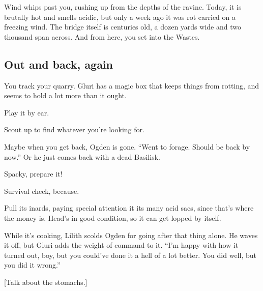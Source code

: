 \begin{multicols}{2}
  Wind whips past you, rushing up from the depths of the ravine.
  Today, it is brutally hot and smells acidic, but only a week ago it was rot carried on
    a freezing wind.
  The bridge itself is centuries old, a dozen yards wide and two thousand span across.
  And from here, you set into the Wastes.

  \subsection{Out and back, again}

  You track your quarry.
  Gluri has a magic box that keeps things from rotting, and seems to hold a lot more than it ought.

  Play it by ear.

  Scout up to find whatever you're looking for.

  Maybe when you get back, Ogden is gone.
  ``Went to forage.
    Should be back by now.''
  Or he just comes back with a dead Basilisk.

  Spacky, prepare it!

  Survival check, because.

  Pull its inards, paying special attention it its many acid sacs, since that's where the money is.
  Head's in good condition, so it can get lopped by itself.

  While it's cooking, Lilith scolds Ogden for going after that thing alone.
  He waves it off, but Gluri adds the weight of command to it.
  ``I'm happy with how it turned out, boy, but you could've done it a hell of a lot better.
    You did well, but you did it wrong.''

  [Talk about the stomachs.]
  \end{multicols}
